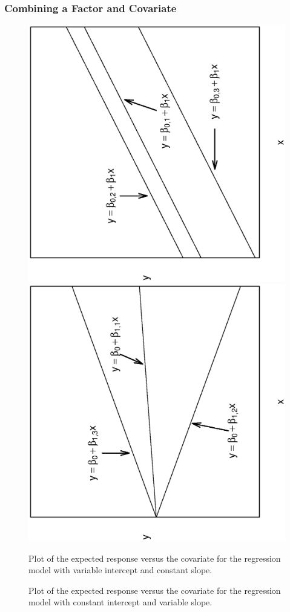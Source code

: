 \begin{frame}%
\frametitle{Combining a Factor and Covariate}
\begin{figure}[htp]
  \begin{center}
    \includegraphics[width=1\textwidth,angle=270,scale=0.45]{Chapter4/F4TheoryVarIntConSlope.ps}
    \includegraphics[width=1\textwidth,angle=270,scale=0.45]{Chapter4/F4TheoryConIntVarSlope.ps} \hfill
     \parbox[t]{2in}{\caption{ \tiny  Plot of the expected response versus the covariate for the regression model
with variable intercept and constant slope.}} \hfill
    \parbox[t]{2in}{\caption{ \tiny  Plot of the expected response versus the covariate for the regression model
with constant intercept and variable slope.}}
  \end{center}
\end{figure}
\end{frame}

